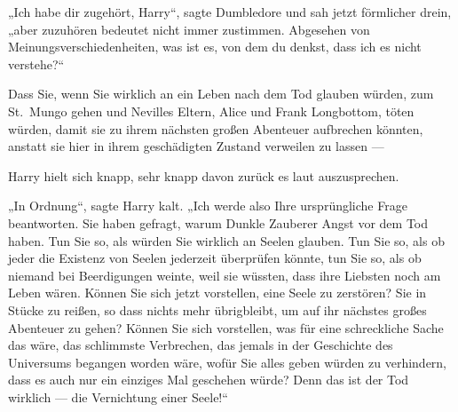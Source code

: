 „Ich habe dir zugehört, Harry“, sagte Dumbledore und sah jetzt förmlicher drein, „aber zuzuhören bedeutet nicht immer zustimmen. Abgesehen von Meinungsverschiedenheiten, was ist es, von dem du denkst, dass ich es nicht verstehe?“

Dass Sie, wenn Sie wirklich an ein Leben nach dem Tod glauben würden, zum St.~Mungo gehen und Nevilles Eltern, Alice und Frank Longbottom, töten würden, damit sie zu ihrem nächsten großen Abenteuer aufbrechen könnten, anstatt sie hier in ihrem geschädigten Zustand verweilen zu lassen —

Harry hielt sich knapp, sehr knapp davon zurück es laut auszusprechen.

„In Ordnung“, sagte Harry kalt.
„Ich werde also Ihre ursprüngliche Frage beantworten. Sie haben gefragt, warum Dunkle Zauberer Angst vor dem Tod haben. Tun Sie so, als würden Sie wirklich an Seelen glauben. Tun Sie so, als ob jeder die Existenz von Seelen jederzeit überprüfen könnte, tun Sie so, als ob niemand bei Beerdigungen weinte, weil sie wüssten, dass ihre Liebsten noch am Leben wären. Können Sie sich jetzt vorstellen, eine Seele zu zerstören? Sie in Stücke zu reißen, so dass nichts mehr übrigbleibt, um auf ihr nächstes großes Abenteuer zu gehen? Können Sie sich vorstellen, was für eine schreckliche Sache das wäre, das schlimmste Verbrechen, das jemals in der Geschichte des Universums begangen worden wäre, wofür Sie alles geben würden zu verhindern, dass es auch nur ein einziges Mal geschehen würde? Denn das ist der Tod wirklich — die Vernichtung einer Seele!“

